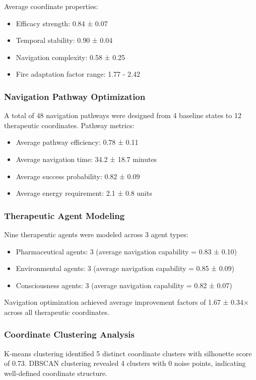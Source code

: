 Average coordinate properties:
\begin{itemize}
\item Efficacy strength: 0.84 ± 0.07
\item Temporal stability: 0.90 ± 0.04
\item Navigation complexity: 0.58 ± 0.25
\item Fire adaptation factor range: 1.77 - 2.42
\end{itemize}

\subsubsection{Navigation Pathway Optimization}

A total of 48 navigation pathways were designed from 4 baseline states to 12 therapeutic coordinates. Pathway metrics:
\begin{itemize}
\item Average pathway efficiency: 0.78 ± 0.11
\item Average navigation time: 34.2 ± 18.7 minutes
\item Average success probability: 0.82 ± 0.09
\item Average energy requirement: 2.1 ± 0.8 units
\end{itemize}

\subsubsection{Therapeutic Agent Modeling}

Nine therapeutic agents were modeled across 3 agent types:
\begin{itemize}
\item Pharmaceutical agents: 3 (average navigation capability = 0.83 ± 0.10)
\item Environmental agents: 3 (average navigation capability = 0.85 ± 0.09)  
\item Consciousness agents: 3 (average navigation capability = 0.82 ± 0.07)
\end{itemize}

Navigation optimization achieved average improvement factors of 1.67 ± 0.34× across all therapeutic coordinates.

\subsubsection{Coordinate Clustering Analysis}

K-means clustering identified 5 distinct coordinate clusters with silhouette score of 0.73. DBSCAN clustering revealed 4 clusters with 0 noise points, indicating well-defined coordinate structure.

